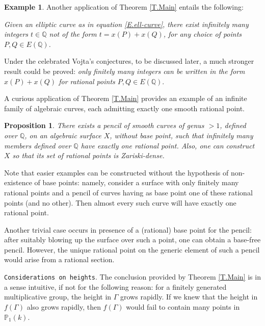 \documentclass[leqno,12pt]{article} %
\def\Q{{{\mathbb Q}}}
\def\P{{{\mathbb P}}}
\theoremstyle{plain} %
\newtheorem{proposition}[theorem]{\indent\sc Proposition}
\theoremstyle{definition} %
\newtheorem{example}[theorem]{\indent\sc Example}
\begin{document}
\smallskip

\begin{example}\label{Ex:somme}
Another application of Theorem \ref{T.Main} entails the following: \smallskip

{\it Given an elliptic curve as in equation \eqref{E.ell-curve}, there exist infinitely many integers $t\in\Q$ not of the form $t=x(P)+x(Q)$, for any  choice of points $P,Q\in E(\Q)$.
}
\smallskip

Under the celebrated Vojta's conjectures, to be discussed later, a much stronger result could be proved: {\it   only finitely many integers can be written in the form $x(P)+x(Q)$ for rational points $P,Q\in E(\Q)$}.
\end{example}
 




\medskip

A curious application of Theorem \ref{T.Main} provides an example of an infinite family of algebraic curves, each admitting exactly one smooth rational point.

\begin{proposition}\label{Prop.1-solo}  There exists a pencil of smooth curves of genus $>1$, defined over $\Q$, on an algebraic surface $X$, without base point, such that infinitely many members defined over $\Q$ have exactly one  rational point. Also, one can construct $X$ so that its set of rational points is Zariski-dense.
\end{proposition}

\smallskip

Note that easier examples can be constructed without the hypothesis of non-existence of base points: namely, consider a surface with only finitely many rational points and a pencil of curves having as base point one of these rational points (and no other). Then almost every such curve will have exactly one rational point. 

Another trivial case occurs  in presence of a (rational) base point for the pencil: after suitably blowing up the surface over such a point, one can obtain a base-free pencil. However,  the unique rational point on the generic element of such a pencil would arise from a rational section.  


\medskip


{\tt Considerations on heights}. The conclusion provided by Theorem \ref{T.Main} is in a sense intuitive, if not for the following reason: for a finitely generated multiplicative group, the height in $\Gamma$ grows rapidly. If we knew that the height in $f(\Gamma)$ also grows rapidly, then $f(\Gamma)$ would fail to contain many points in $\P_1(k)$.
\end{document}
